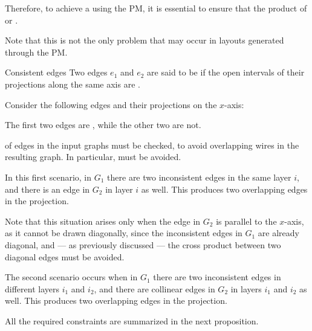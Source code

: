 \documentclass[a4paper, 12pt]{report}
\begin{document}
    Therefore, to achieve a  using the PM, it is essential to ensure that the product of  or  .

    Note that this is not the only problem that may occur in layouts generated through the PM.

    \begin{frameddefn}{Consistent edges}
        Two edges $e_1$ and $e_2$ are said to be  if the open intervals of their projections along the same axis are .
    \end{frameddefn}

    \begin{example}
        Consider the following edges and their projections on the $x$-axis:


        The first two edges are , while the other two are not.
    \end{example}

     of edges in the input graphs must be checked, to avoid overlapping wires in the resulting graph. In particular,  must be avoided.

        In this first scenario, in $G_1$ there are two inconsistent edges in the same layer $i$, and there is an edge in $G_2$ in layer $i$ as well. This produces two overlapping edges in the projection.


        Note that this situation arises only when the edge in $G_2$ is parallel to the $x$-axis, as it cannot be drawn diagonally, since the inconsistent edges in $G_1$ are already diagonal, and ---  as previously discussed --- the cross product between two diagonal edges must be avoided.

        The second scenario occurs when in $G_1$ there are two inconsistent edges in different layers $i_1$ and $i_2$, and there are collinear edges in $G_2$ in layers $i_1$ and $i_2$ as well. This produces two overlapping edges in the projection.


    All the required constraints are summarized in the next proposition.
\end{document}
